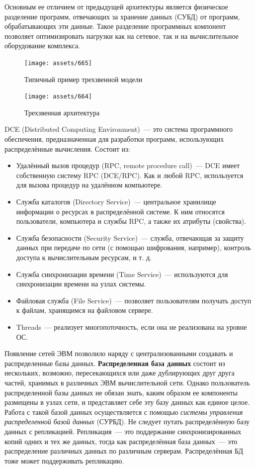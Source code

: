 Основным ее отличием от предыдущей архитектуры является физическое разделение
программ, отвечающих за хранение данных (СУБД) от программ, 
обрабатывающих эти данные. Такое разделение программных компонент позволяет оптимизировать
нагрузки как на сетевое, так и на вычислительное оборудование комплекса.~\\

\begin{figure}[H]
    \centering
    \texttt{[image: assets/665]}
    \caption{Типичный пример трехзвенной модели}
\end{figure}

\begin{figure}[H]
    \centering
    \texttt{[image: assets/664]}
    \caption{Трехзвенная архитектура}
\end{figure}

DCE (Distributed Computing Environment)~--- это система программного обеспечения,
предназначенная для разработки программ, использующих распределённые вычисления. \autocite{dce}
Состоит из:
\begin{itemize}
    \item Удалённый вызов процедур (RPC, remote procedure call)~--- DCE имеет собственную систему RPC (DCE/RPC). Как и любой RPC, используется для вызова процедур на удалённом компьютере.
    \item Служба каталогов (Directory Service)~--- центральное хранилище информации о ресурсах в распределённой системе. К ним относятся пользователи, компьютера и службы RPC, а также их атрибуты (свойства).
    \item Служба безопасности (Security Service)~--- служба, отвечающая за защиту данных при передаче по сети (с помощью шифрования, например), контроль доступа к вычислительным ресурсам, и т. д.
    \item Служба синхронизации времени (Time Service)~--- используются для синхронизации времени на узлах системы.
    \item Файловая служба (File Service)~--- позволяет пользователям получать доступ к файлам, хранящимся на файловом сервере.
    \item Threads~--- реализует многопоточность, если она не реализована на уровне ОС.
\end{itemize}

Появление сетей ЭВМ позволило наряду с централизованными создавать и распределенные базы данных.
\textbf{Распределенная база данных} состоит из нескольких, возможно, пересекающихся или даже дублирующих друг друга
частей, хранимых в различных ЭВМ вычислительной сети. Однако пользователь распределенной базы данных не обязан
знать, каким образом ее компоненты размещены в узлах сети, и представляет себе эту базу данных как единое
целое. Работа с такой базой данных осуществляется с помощью \textit{системы управления распределенной базой данных} (СУРБД).
Не следует путать распределённую базу данных с репликацией. Репликация~--- это поддержание синхронизированных
копий одних и тех же данных, тогда как распределённая база данных~--- это распределение различных данных по различным серверам.
Распределённая БД тоже может поддерживать репликацию.

